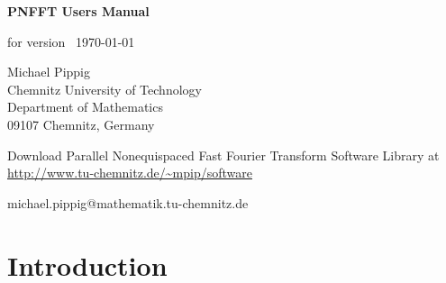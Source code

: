 \documentclass[a4paper,11pt,final,openright,headsepline]{scrreprt}
\numberwithin{figure}{chapter}
\numberwithin{table}{chapter}
\numberwithin{equation}{chapter}
\begin{document}
  \setcounter{equation}{0}

  \begin{titlepage}
    \begin{center}
      \vspace*{3cm}
      {\Huge {\textbf{\textsf{PNFFT Users Manual\\}}}}

      \vspace*{1cm}
      for version \pnfftversion\, \today

      \vspace*{3cm}
      Michael Pippig\\
      Chemnitz University of Technology\\
      Department of Mathematics\\
      09107 Chemnitz, Germany

      \vspace*{3cm}
      Download Parallel Nonequispaced Fast Fourier Transform Software Library at \\
      {\large \url{http://www.tu-chemnitz.de/~mpip/software}}
    \end{center}
    \vfill
    michael.pippig@mathematik.tu-chemnitz.de
  \end{titlepage}

  \tableofcontents


  \chapter{Introduction}\label{kap:intro}
  

\end{document}
